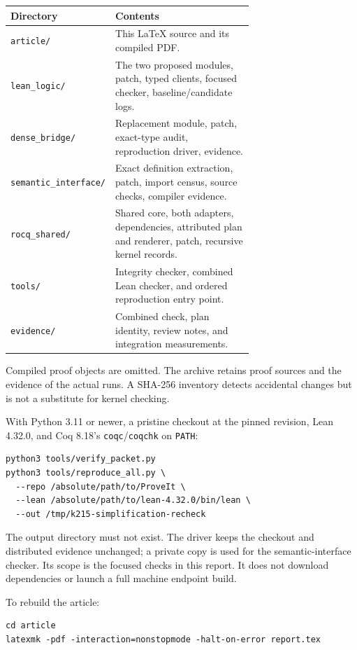 \documentclass[11pt]{article}
\begin{document}
\begin{center}\small
\begin{tabular}{lp{0.69\linewidth}}
\toprule
Directory & Contents\\
\midrule
\texttt{article/} & This LaTeX source and its compiled PDF.\\
\texttt{lean\_logic/} & The two proposed modules, patch, typed clients, focused checker, baseline/candidate logs.\\
\texttt{dense\_bridge/} & Replacement module, patch, exact-type audit, reproduction driver, evidence.\\
\texttt{semantic\_interface/} & Exact definition extraction, patch, import census, source checks, compiler evidence.\\
\texttt{rocq\_shared/} & Shared core, both adapters, dependencies, attributed plan and renderer, patch, recursive kernel records.\\
\texttt{tools/} & Integrity checker, combined Lean checker, and ordered reproduction entry point.\\
\texttt{evidence/} & Combined check, plan identity, review notes, and integration measurements.\\
\bottomrule
\end{tabular}
\end{center}

Compiled proof objects are omitted. The archive retains proof sources and the evidence of the actual runs. A SHA-256 inventory detects accidental changes but is not a substitute for kernel checking.

With Python 3.11 or newer, a pristine checkout at the pinned revision, Lean 4.32.0, and Coq 8.18's \texttt{coqc}/\texttt{coqchk} on \texttt{PATH}:
\begin{lstlisting}
python3 tools/verify_packet.py
python3 tools/reproduce_all.py \
  --repo /absolute/path/to/ProveIt \
  --lean /absolute/path/to/lean-4.32.0/bin/lean \
  --out /tmp/k215-simplification-recheck
\end{lstlisting}
The output directory must not exist. The driver keeps the checkout and distributed evidence unchanged; a private copy is used for the semantic-interface checker. Its scope is the focused checks in this report. It does not download dependencies or launch a full machine endpoint build.

To rebuild the article:
\begin{lstlisting}
cd article
latexmk -pdf -interaction=nonstopmode -halt-on-error report.tex
\end{lstlisting}
\end{document}
